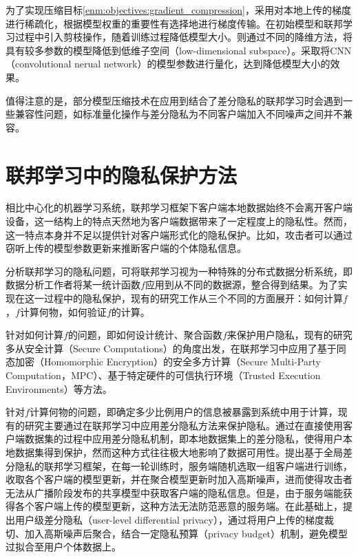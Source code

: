 为了实现压缩目标\ref{enm:objectives:gradient_compression}，\parencite{lin2017deep}采用对本地上传的梯度进行稀疏化，根据模型权重的重要性有选择地进行梯度传输。\parencite{jiang2022model}在初始模型和联邦学习过程中引入剪枝操作，随着训练过程降低模型大小。\parencite{kwon2022efficient}则通过不同的降维方法，将具有较多参数的模型降低到低维子空间（low-dimensional subspace）。\parencite{wu2016quantized}采取将CNN（convolutional nerual network）的模型参数进行量化，达到降低模型大小的效果。

值得注意的是，部分模型压缩技术在应用到结合了差分隐私的联邦学习时会遇到一些兼容性问题，如标准量化操作与差分隐私为不同客户端加入不同噪声之间并不兼容\cite{kairouz2021advances}。

\section{联邦学习中的隐私保护方法}

相比中心化的机器学习系统，联邦学习框架下客户端本地数据始终不会离开客户端设备，这一结构上的特点天然地为客户端数据带来了一定程度上的隐私性。然而，这一特点本身并不足以提供针对客户端形式化的隐私保护。比如，攻击者可以通过窃听上传的模型参数更新来推断客户端的个体隐私信息。

分析联邦学习的隐私问题，可将联邦学习视为一种特殊的分布式数据分析系统，即数据分析工作者将某一统计函数$f$应用到从不同的数据源，整合得到结果。为了实现在这一过程中的隐私保护，现有的研究工作从三个不同的方面展开\cite{kairouz2021advances}：如何计算$f$，$f$计算何物，如何验证$f$的计算。

针对如何计算$f$的问题，即如何设计统计、聚合函数$f$来保护用户隐私，现有的研究多从安全计算（Secure Computations）的角度出发，在联邦学习中应用了基于同态加密（Homomorphic Encryption）的安全多方计算（Secure Multi-Party Computation，MPC）\cite{yao1986generate}、基于特定硬件的可信执行环境（Trusted Execution Environments）\cite{subramanyan2017formal}等方法。

针对$f$计算何物的问题，即确定多少比例用户的信息被暴露到系统中用于计算，现有的研究主要通过在联邦学习中应用差分隐私方法来保护隐私。通过在直接使用客户端数据集的过程中应用差分隐私机制，即本地数据集上的差分隐私，使得用户本地数据集得到保护，然而这种方式往往极大地影响了数据可用性。\parencite{geyer2017differentially}提出基于全局差分隐私的联邦学习框架，在每一轮训练时，服务端随机选取一组客户端进行训练，收取各个客户端的模型更新，并在聚合模型更新时加入高斯噪声，进而使得攻击者无法从广播阶段发布的共享模型中获取客户端的隐私信息。但是，由于服务端能获得各个客户端上传的模型更新，这种方法无法防范恶意的服务端。在此基础上，\parencite{abadi2016deep, mcmahan2017learning, zheng2020preserving}提出用户级差分隐私（user-level differential privacy），通过将用户上传的梯度裁切、加入高斯噪声后聚合，结合一定隐私预算（privacy budget）机制，避免模型过拟合至用户个体数据上。

